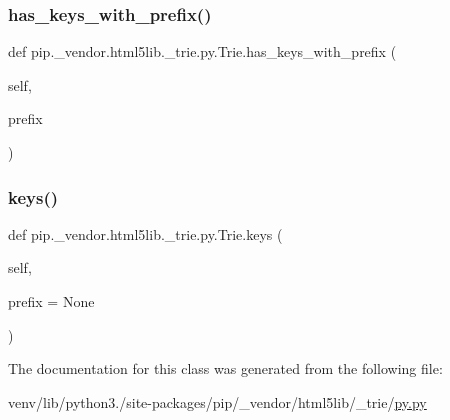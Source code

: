 \subsubsection{\texorpdfstring{has\+\_\+keys\+\_\+with\+\_\+prefix()}{has\_keys\_with\_prefix()}}
{\footnotesize\ttfamily def pip.\+\_\+vendor.\+html5lib.\+\_\+trie.\+py.\+Trie.\+has\+\_\+keys\+\_\+with\+\_\+prefix (\begin{DoxyParamCaption}\item[{}]{self,  }\item[{}]{prefix }\end{DoxyParamCaption})}

\mbox{\label{classpip_1_1__vendor_1_1html5lib_1_1__trie_1_1py_1_1Trie_ad8be9b392bc45cfc72ca49ed1d52e127}} 
\subsubsection{\texorpdfstring{keys()}{keys()}}
{\footnotesize\ttfamily def pip.\+\_\+vendor.\+html5lib.\+\_\+trie.\+py.\+Trie.\+keys (\begin{DoxyParamCaption}\item[{}]{self,  }\item[{}]{prefix = {\ttfamily None} }\end{DoxyParamCaption})}



The documentation for this class was generated from the following file\+:\begin{DoxyCompactItemize}
\item 
venv/lib/python3./site-\/packages/pip/\+\_\+vendor/html5lib/\+\_\+trie/\hyperlink{py_8py}{py.\+py}\end{DoxyCompactItemize}
